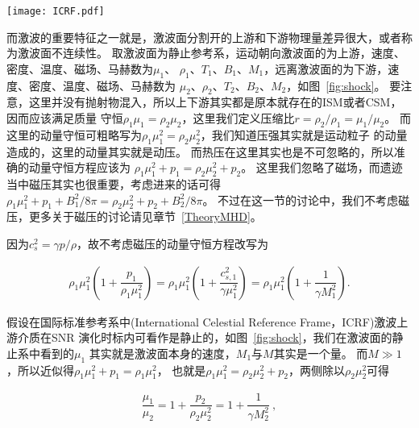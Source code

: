 \begin{figure*}
    \centering
    \texttt{[image: ICRF.pdf]}
    \caption{激波面静止参考系和国际标准参考系上下游的状态。}
\label{fig:shock}
\end{figure*}

而激波的重要特征之一就是，激波面分割开的上游和下游物理量差异很大，或者称为激波面不连续性。
取激波面为静止参考系，运动朝向激波面的为上游，速度、密度、温度、磁场、马赫数为$\mu_1$、
$\rho_1$、$T_1$、$B_1$、$M_1$，远离激波面的为下游，速度、密度、温度、磁场、马赫数为
$\mu_2$、$\rho_2$、$T_2$、$B_2$、$M_2$，如图~\ref{fig:shock}。
要注意，这里并没有抛射物混入，所以上下游其实都是原本就存在的ISM或者CSM，因而应该满足质量
守恒$\rho_1\mu_1=\rho_2\mu_2$，这里我们定义压缩比$r=\rho_2/\rho_1=\mu_1/\mu_2$。
而这里的动量守恒可粗略写为$\rho_1\mu_1^2=\rho_2\mu_2^2$，我们知道压强其实就是运动粒子
的动量造成的，这里的动量其实就是动压。
而热压在这里其实也是不可忽略的，所以准确的动量守恒方程应该为
$\rho_1\mu_1^2+p_1=\rho_2\mu_2^2+p_2$。
这里我们忽略了磁场，而遗迹当中磁压其实也很重要，考虑进来的话可得
$\rho_1\mu_1^2+p_1+B_1^2/8\pi=\rho_2\mu_2^2+p_2+B_2^2/8\pi$。
不过在这一节的讨论中，我们不考虑磁压，更多关于磁压的讨论请见章节~\ref{TheoryMHD}。


因为$c_{s}^{2}=\gamma p/\rho$，故不考虑磁压的动量守恒方程改写为

\begin{equation}
  \begin{aligned}
    \rho_{1} \mu_{1}^{2}\left(1+\dfrac{p_{1}}{\rho_{1} \mu_{1}^{2}}\right)=
    \rho_{1} \mu_{1}^{2}\left(1+\dfrac{c_{s, 1}^{2}}{\gamma \mu_{1}^{2}}\right)=
    \rho_{1} \mu_{1}^{2}\left(1+\dfrac{1}{\gamma M_1^{2}}\right).
  \end{aligned}
\end{equation}

假设在国际标准参考系中(International Celestial Reference Frame，ICRF)激波上游介质在SNR
演化时标内可看作是静止的，如图~\ref{fig:shock}，我们在激波面的静止系中看到的$\mu_1$
其实就是激波面本身的速度，$M_1$与$M$其实是一个量。
而$M\gg 1$，所以近似得$\rho_1\mu_1^2+p_1=\rho_1\mu_1^2$，
也就是$\rho_1\mu_1^2=\rho_2\mu_2^2+p_2$，两侧除以$\rho_2\mu_2^2$可得

\begin{equation}
    \begin{aligned}
       \dfrac{\mu_{1}}{\mu_{2}}=1+\dfrac{p_{2}}{\rho_{2} \mu_{2}^{2}}
       =1+\dfrac{1}{\gamma M_{2}^{2}} \ ,
    \end{aligned}
\end{equation}

